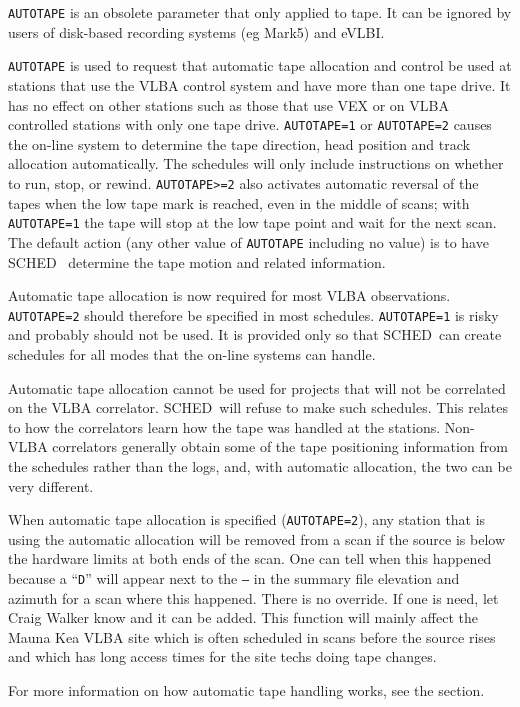 \documentclass{report}
\newcommand{\schedb}{{\sc SCHED~}}
\begin{document}
{\tt AUTOTAPE} is an obsolete parameter that only applied to tape.
It can be ignored by users of disk-based recording systems (eg Mark5)
and eVLBI.

{\tt AUTOTAPE} is used to request that automatic tape allocation and
control be used at stations that use the VLBA control system and have
more than one tape drive.  It has no effect on other stations such as
those that use VEX or on VLBA controlled stations with only one tape
drive.  {\tt AUTOTAPE=1} or {\tt AUTOTAPE=2} causes the on-line system
to determine the tape direction, head position and track allocation
automatically. The schedules will only include instructions on whether
to run, stop, or rewind. {\tt AUTOTAPE>=2} also activates automatic
reversal of the tapes when the low tape mark is reached, even in the
middle of scans; with {\tt AUTOTAPE=1} the tape will stop at the low
tape point and wait for the next scan. The default action (any other
value of {\tt AUTOTAPE} including no value) is to have \schedb
determine the tape motion and related information.

Automatic tape allocation is now required for most VLBA observations.
{\tt AUTOTAPE=2} should therefore be specified in most schedules.
{\tt AUTOTAPE=1} is risky and probably should not be used.  It is
provided only so that \schedb can create schedules for all modes
that the on-line systems can handle.

Automatic tape allocation cannot be used for projects that will not
be correlated on the VLBA correlator.  \schedb will refuse to make
such schedules.  This relates to how the correlators learn how the
tape was handled at the stations.  Non-VLBA correlators generally
obtain some of the tape positioning information from the schedules
rather than the logs, and, with automatic allocation, the two
can be very different.

When automatic tape allocation is specified ({\tt AUTOTAPE=2}), any
station that is using the automatic allocation will be removed from a
scan if the source is below the hardware limits at both ends of the
scan.  One can tell when this happened because a ``{\tt D}'' will
appear next to the {\tt ---} in the summary file elevation and azimuth
for a scan where this happened.  There is no override.  If one is
need, let Craig Walker know and it can be added.  This function
will mainly affect the Mauna Kea VLBA site which is often scheduled
in scans before the source rises and which has long access times
for the site techs doing tape changes.

For more information on how automatic tape handling works, see the
 section.
\end{document}
